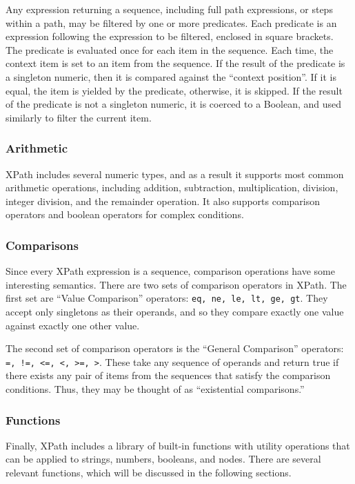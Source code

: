 \documentclass{scrartcl}
\begin{document}
Any expression returning a sequence, including full path expressions, or steps
within a path, may be filtered by one or more predicates. Each predicate is an
expression following the expression to be filtered, enclosed in square brackets.
The predicate is evaluated once for each item in the sequence. Each time, the
context item is set to an item from the sequence. If the result of the predicate
is a singleton numeric, then it is compared against the ``context position''. If
it is equal, the item is yielded by the predicate, otherwise, it is skipped. If
the result of the predicate is not a singleton numeric, it is coerced to a
Boolean, and used similarly to filter the current item.

\subsubsection{Arithmetic}

XPath includes several numeric types, and as a result it supports most common
arithmetic operations, including addition, subtraction, multiplication,
division, integer division, and the remainder operation. It also supports
comparison operators and boolean operators for complex conditions.

\subsubsection{Comparisons}

Since every XPath expression is a sequence, comparison operations have some
interesting semantics. There are two sets of comparison operators in XPath. The
first set are ``Value Comparison'' operators: \texttt{eq, ne, le, lt, ge, gt}.
They accept only singletons as their operands, and so they compare exactly one
value against exactly one other value.

The second set of comparison operators is the ``General Comparison'' operators:
\texttt{=, !=, <=, <, >=, >}. These take any sequence of operands and return
true if there exists any pair of items from the sequences that satisfy the
comparison conditions. Thus, they may be thought of as ``existential
comparisons.''

\subsubsection{Functions}

Finally, XPath includes a library of built-in functions with utility operations
that can be applied to strings, numbers, booleans, and nodes. There are several
relevant functions, which will be discussed in the following sections.
\end{document}
